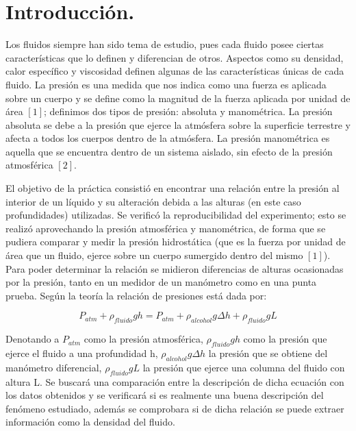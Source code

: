 \documentclass[a4paper]{article}
\begin{document}
\section*{Introducción.}
Los fluidos siempre han sido tema de estudio, pues cada fluido posee ciertas características que lo definen y diferencian de otros. Aspectos como su densidad, calor específico y viscosidad definen algunas de las características únicas de cada fluido. La presión es una medida que nos indica como una fuerza es aplicada sobre un cuerpo y se define como la magnitud de la fuerza aplicada por unidad de área $[1]$; definimos dos tipos de presión: absoluta y manométrica. La presión absoluta se debe a la presión que ejerce la atmósfera sobre la superficie terrestre y afecta a todos los cuerpos dentro de la atmósfera. La presión manométrica es aquella que se encuentra dentro de un sistema aislado, sin efecto de la presión atmosférica $[2]$. 

El objetivo de la práctica consistió en encontrar una relación entre la presión al interior de un líquido y su alteración debida a las alturas (en este caso profundidades) utilizadas. Se verificó la reproducibilidad del experimento; esto se realizó aprovechando la presión atmosférica y manométrica, de forma que se pudiera  comparar y medir la presión hidrostática (que es la fuerza por unidad de área que un fluido, ejerce sobre un cuerpo sumergido dentro del mismo $[1]$). Para poder determinar la relación se midieron diferencias de alturas ocasionadas por la presión, tanto en un medidor de un manómetro como en una punta prueba. Según la teoría la relación de presiones está dada por:

\begin{equation}
    P_{atm} + \rho_{fluido}gh = P_{atm} + \rho_{alcohol}g\Delta h + \rho_{fluido}gL
\end{equation}

Denotando a $P_{atm}$ como la presión atmosférica, $\rho_{fluido}gh$ como la presión que ejerce el fluido a una profundidad h, $\rho_{alcohol}g\Delta h$ la presión que se obtiene del manómetro diferencial, $\rho_{fluido}gL$ la presión que ejerce una columna del fluido con altura L. Se buscará una comparación entre la descripción de dicha ecuación con los datos obtenidos y se verificará si es realmente una buena descripción del fenómeno estudiado, además se comprobara si de dicha relación se puede extraer información como la densidad del fluido.
\end{document}
